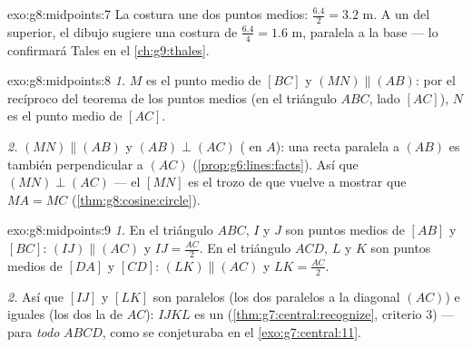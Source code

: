 \begin{solution}{exo:g8:midpoints:7}
La costura une dos puntos medios: $\frac{6.4}{2} = 3.2$ m. A un
 del  superior, el dibujo sugiere una costura de
$\frac{6.4}{4} = 1.6$ m, paralela a la base --- lo confirmará Tales
en el \cref{ch:g9:thales}.
\end{solution}

\begin{solution}{exo:g8:midpoints:8}
\emph{1.} $M$ es el punto medio de $[BC]$ y $(MN) \parallel (AB)$:
por el recíproco del teorema de los puntos medios (en el triángulo $ABC$,
lado $[AC]$), $N$ es el punto medio de $[AC]$.

\emph{2.} $(MN) \parallel (AB)$ y $(AB) \perp (AC)$ (
en $A$): una recta paralela a $(AB)$ es también perpendicular a $(AC)$
(\cref{prop:g6:lines:facts}). Así que $(MN) \perp (AC)$ --- el 
$[MN]$ es el trozo de  que vuelve a mostrar que
$MA = MC$ (\cref{thm:g8:cosine:circle}).
\end{solution}

\begin{solution}{exo:g8:midpoints:9}
\emph{1.} En el triángulo $ABC$, $I$ y $J$ son puntos medios de $[AB]$ y
$[BC]$: $(IJ) \parallel (AC)$ y $IJ = \frac{AC}{2}$. En el triángulo
$ACD$, $L$ y $K$ son puntos medios de $[DA]$ y $[CD]$:
$(LK) \parallel (AC)$ y $LK = \frac{AC}{2}$.

\emph{2.} Así que $[IJ]$ y $[LK]$ son paralelos (los dos paralelos a la
diagonal $(AC)$) e iguales (los dos la  de $AC$): $IJKL$ es un
 (\cref{thm:g7:central:recognize}, criterio 3) ---
para \emph{todo}  $ABCD$, como se conjeturaba en el
\cref{exo:g7:central:11}.
\end{solution}

